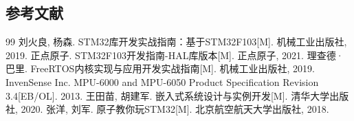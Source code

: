 \documentclass[12pt, a4paper]{ctexart}
\begin{document}
\subsection{参考文献}
\begin{thebibliography}{99}
 刘火良, 杨森. STM32库开发实战指南：基于STM32F103[M]. 机械工业出版社, 2019.
 正点原子. STM32F103开发指南-HAL库版本[M]. 正点原子, 2021.
 理查德·巴里. FreeRTOS内核实现与应用开发实战指南[M]. 机械工业出版社, 2019.
 InvenSense Inc. MPU-6000 and MPU-6050 Product Specification Revision 3.4[EB/OL]. 2013.
 王田苗, 胡建军. 嵌入式系统设计与实例开发[M]. 清华大学出版社, 2020.
 张洋, 刘军. 原子教你玩STM32[M]. 北京航空航天大学出版社, 2018.
\end{thebibliography}
\end{document}
